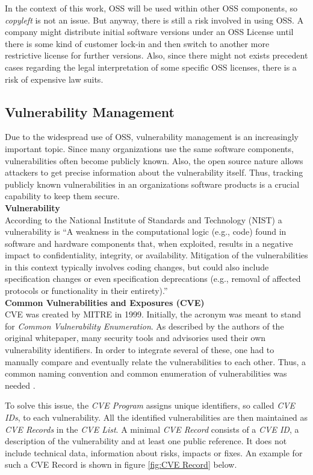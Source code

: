 In the context of this work, OSS will be used within other OSS components, so \textit{copyleft} is not an issue. But anyway, there is still a risk involved in using OSS. A company might distribute initial software versions under an OSS License until there is some kind of customer lock-in and then switch to another more restrictive license for further versions. Also, since there might not exists precedent cases regarding the legal interpretation of some specific OSS licenses, there is a risk of expensive law suits.

\subsection{Vulnerability Management}
Due to the widespread use of OSS, vulnerability management is an increasingly important topic. Since many organizations use the same software components, vulnerabilities often become publicly known. Also, the open source nature allows attackers to get precise information about the vulnerability itself. Thus, tracking publicly known vulnerabilities in an organizations software products is a crucial capability to keep them secure.\\

\noindent
\textbf{Vulnerability}\\
\noindent
According to the National Institute of Standards and Technology (NIST) a vulnerability is \enquote{A weakness in the computational logic (e.g., code) found in software and hardware components that, when exploited, results in a negative impact to confidentiality, integrity, or availability. Mitigation of the vulnerabilities in this context typically involves coding changes, but could also include specification changes or even specification deprecations (e.g., removal of affected protocols or functionality in their entirety).}\cite{NVDWebsite}\\

\noindent
\textbf{Common Vulnerabilities and Exposures (CVE)}\\
\noindent 
CVE was created by MITRE in 1999. Initially, the acronym was meant to stand for \textit{Common Vulnerability Enumeration}. As described by the authors of the original whitepaper, many security tools and advisories used their own vulnerability identifiers. In order to integrate several of these, one had to manually compare and eventually relate the vulnerabilities to each other. Thus, a common naming convention and common enumeration of vulnerabilities was needed \cite{CVEOriginal}.\par
To solve this issue, the \textit{CVE Program} assigns unique identifiers, so called \textit{CVE IDs}, to each vulnerability. All the identified vulnerabilities are then maintained as \textit{CVE Records} in the \textit{CVE List}. A minimal \textit{CVE Record} consists of a \textit{CVE ID}, a description of the vulnerability and at least one public reference. It does not include technical data, information about risks, impacts or fixes. An example for such a CVE Record is shown in figure \ref{fig:CVE Record} below.

